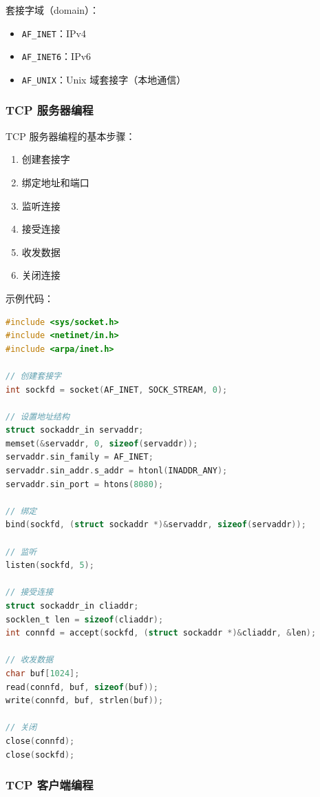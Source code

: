 套接字域（domain）：
\begin{itemize}
  \item \texttt{AF\_INET}：IPv4
  \item \texttt{AF\_INET6}：IPv6
  \item \texttt{AF\_UNIX}：Unix 域套接字（本地通信）
\end{itemize}

\subsubsection{TCP 服务器编程}

TCP 服务器编程的基本步骤：

\begin{enumerate}
  \item 创建套接字
  \item 绑定地址和端口
  \item 监听连接
  \item 接受连接
  \item 收发数据
  \item 关闭连接
\end{enumerate}

示例代码：
\begin{lstlisting}[language=C]
#include <sys/socket.h>
#include <netinet/in.h>
#include <arpa/inet.h>

// 创建套接字
int sockfd = socket(AF_INET, SOCK_STREAM, 0);

// 设置地址结构
struct sockaddr_in servaddr;
memset(&servaddr, 0, sizeof(servaddr));
servaddr.sin_family = AF_INET;
servaddr.sin_addr.s_addr = htonl(INADDR_ANY);
servaddr.sin_port = htons(8080);

// 绑定
bind(sockfd, (struct sockaddr *)&servaddr, sizeof(servaddr));

// 监听
listen(sockfd, 5);

// 接受连接
struct sockaddr_in cliaddr;
socklen_t len = sizeof(cliaddr);
int connfd = accept(sockfd, (struct sockaddr *)&cliaddr, &len);

// 收发数据
char buf[1024];
read(connfd, buf, sizeof(buf));
write(connfd, buf, strlen(buf));

// 关闭
close(connfd);
close(sockfd);
\end{lstlisting}

\subsubsection{TCP 客户端编程}

